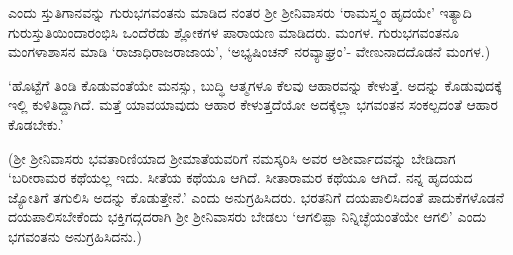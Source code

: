 ಎಂದು ಸ್ತುತಿಗಾನವನ್ನು ಗುರುಭಗವಂತನು ಮಾಡಿದ ನಂತರ ಶ್ರೀ ಶ್ರೀನಿವಾಸರು `ರಾಮಸ್ತ್ವಂ ಹೃದಯೇ' ಇತ್ಯಾದಿ ಗುರುಸ್ತುತಿಯಿಂದಾರಂಭಿಸಿ ಒಂದೆರೆಡು ಶ್ಲೋಕಗಳ ಪಾರಾಯಣ ಮಾಡಿದರು. ಮಂಗಳ. ಗುರುಭಗವಂತನೂ ಮಂಗಳಾಶಾಸನ ಮಾಡಿ `ರಾಜಾಧಿರಾಜರಾಜಾಯ', `ಅಭ್ಯಷಿಂಚನ್‍ ನರವ್ಯಾಘ್ರಂ'- ವೇಣುನಾದದೊಡನೆ ಮಂಗಳ.) 

`ಹೊಟ್ಟೆಗೆ ತಿಂಡಿ ಕೊಡುವಂತೆಯೇ ಮನಸ್ಸು, ಬುದ್ಧಿ ಆತ್ಮಗಳೂ ಕೆಲವು ಆಹಾರವನ್ನು ಕೇಳುತ್ತೆ. ಅದನ್ನು ಕೊಡುವುದಕ್ಕೆ ಇಲ್ಲಿ ಕುಳಿತಿದ್ದಾಗಿದೆ. ಮತ್ತೆ ಯಾವಯಾವುದು ಆಹಾರ ಕೇಳುತ್ತದೆಯೋ ಅದಕ್ಕೆಲ್ಲಾ ಭಗವಂತನ ಸಂಕಲ್ಪದಂತೆ ಆಹಾರ ಕೊಡಬೇಕು.' 

(ಶ್ರೀ ಶ್ರೀನಿವಾಸರು ಭವತಾರಿಣಿಯಾದ ಶ್ರೀಮಾತೆಯವರಿಗೆ ನಮಸ್ಕರಿಸಿ ಅವರ ಆಶೀರ್ವಾದವನ್ನು ಬೇಡಿದಾಗ `ಬರೀರಾಮರ ಕಥೆಯಲ್ಲ ಇದು. ಸೀತೆಯ ಕಥೆಯೂ ಆಗಿದೆ. ಸೀತಾರಾಮರ ಕಥೆಯೂ ಆಗಿದೆ. ನನ್ನ ಹೃದಯದ ಜ್ಯೋತಿಗೆ ತಗುಲಿಸಿ ಅದನ್ನು ಕೊಡುತ್ತೇನೆ.' ಎಂದು ಅನುಗ್ರಹಿಸಿದರು. ಭರತನಿಗೆ ದಯಪಾಲಿಸಿದಂತೆ ಪಾದುಕೆಗಳೊಡನೆ ದಯಪಾಲಿಸಬೇಕೆಂದು ಭಕ್ತಿಗದ್ಗದರಾಗಿ ಶ್ರೀ ಶ್ರೀನಿವಾಸರು ಬೇಡಲು `ಆಗಲಿಪ್ಪಾ ನಿನ್ನಿಚ್ಛೆಯಂತೆಯೇ ಆಗಲಿ' ಎಂದು ಭಗವಂತನು ಅನುಗ್ರಹಿಸಿದನು.) 
